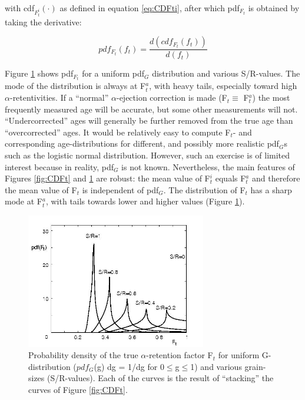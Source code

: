 \documentclass{article}
\begin{document}
with cdf$_{F_t^i}(\cdot)$ as defined in equation \ref{eq:CDFti}, after
which pdf$_{F_t}$ is obtained by taking the derivative:

\begin{equation}
  \label{eq:PDFt}
  pdf_{F_t}(f_t) = \frac{d(cdf_{F_t}(f_t))}{d(f_t)}
\end{equation}

Figure  \ref{fig:PFt2D}  shows   pdf$_{F_t}$  for  a  uniform  pdf$_G$
distribution and  various S/R-values. The mode of  the distribution is
always  at   F$_t^a$,  with   heavy  tails,  especially   toward  high
$\alpha$-retentivities.  If  a ``normal'' $\alpha$-ejection correction
is made (F$_t  \equiv$ F$_t^a$) the most frequently  measured age will
be accurate, but some  other measurements will not. ``Undercorrected''
ages  will  generally  be  further  removed from  the  true  age  than
``overcorrected'' ages. It would  be relatively easy to compute F$_t$-
and corresponding  age-distributions for different,  and possibly more
realistic pdf$_G$s such as the logistic normal distribution.  However,
such an exercise is of limited interest because in reality, pdf$_G$ is
not known.  Nevertheless, the  main features of Figures \ref{fig:CDFt}
and  \ref{fig:PFt2D} are  robust:  the mean  value  of F$_t^i$  equals
F$_t^a$  and therefore  the  mean  value of  F$_t$  is independent  of
pdf$_G$.  The distribution of F$_t$ has a sharp mode at F$_t^a$, with
tails  towards lower  and  higher values (Figure \ref{fig:PFt2D}).\\

\begin{figure}[htbp]
  \centering
  \includegraphics[width=0.7\textwidth]{pdFtUniformG.jpg}
  \caption{Probability density of the true $\alpha$-retention factor F$_t$
    for   uniform   G-distribution   ($pdf_G$(g)   dg   =   1/dg   for
    0$\leq$g$\leq$1) and various grain-sizes (S/R-values). Each of the
    curves  is  the  result  of  ``stacking''  the  curves  of  Figure
    \ref{fig:CDFt}.}
  \label{fig:PFt2D}
\end{figure}
\end{document}
